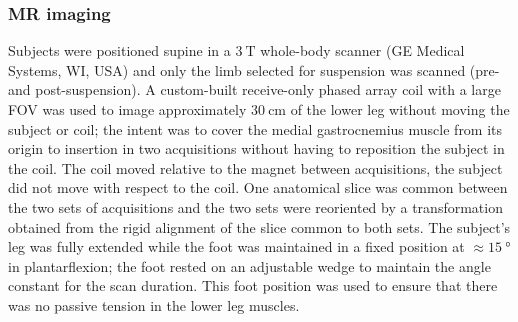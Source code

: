 \subsubsection{MR imaging} 
Subjects were positioned supine in a $\SI{3}{\tesla}$ whole-body scanner (GE Medical Systems, WI, USA) and only the limb selected for suspension was scanned (pre- and post-suspension).
A custom-built receive-only phased array coil with a large FOV was used to image approximately $\SI{30}{\centi\meter}$ of the lower leg without moving the subject or coil; the intent was to cover the medial gastrocnemius muscle from its origin to insertion in two acquisitions without having to reposition the subject in the coil.
The coil moved relative to the magnet between acquisitions, the subject did not move with respect to the coil.
One anatomical slice was common between the two sets of acquisitions and the two sets were reoriented by a transformation obtained from the rigid alignment of the slice common to both sets.
The subject's leg was fully extended while the foot was maintained in a fixed position at $\approx \SI{15}{\degree}$ in plantarflexion; the foot rested on an adjustable wedge to maintain the angle constant for the scan duration. This foot position was used to ensure that there was no passive tension in the lower leg muscles.

